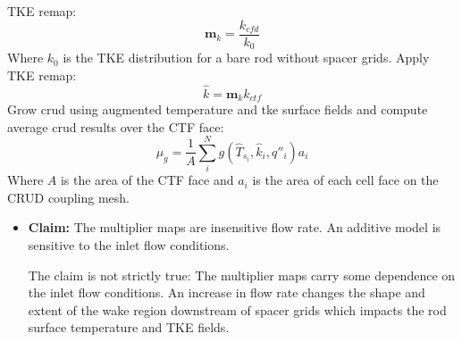 \begin{itemize}
    TKE remap:
    \begin{equation}
       \mathbf m_{k} = \frac{k_{cfd}}{k_{0}}
    \end{equation}
    Where $k_0$ is the TKE distribution for a bare rod without spacer grids.
    Apply TKE remap:
       \begin{equation}
       \hat k = \mathbf m_k k_{ctf}
       \end{equation}
     Grow crud using augmented temperature and tke surface fields and compute average crud results over the CTF face:
     \begin{equation}
     \mu_g = \frac{1}{A} \sum_i^N g(\hat T_{s_i}, \hat k_i, q''_i) a_i
     \end{equation}
    Where $A$ is the area of the CTF face and $a_i$ is the area of each cell face on the CRUD coupling mesh.

    \begin{itemize}
    \item \textbf{Claim:} The multiplier maps are insensitive flow rate.  An additive model is sensitive to the inlet flow conditions.

     The claim is not strictly true: The multiplier maps carry some dependence on the inlet flow conditions.  An increase in flow rate changes the shape and extent of the wake region downstream of spacer grids which impacts the rod surface temperature and TKE fields.


\end{itemize}
\end{itemize}
